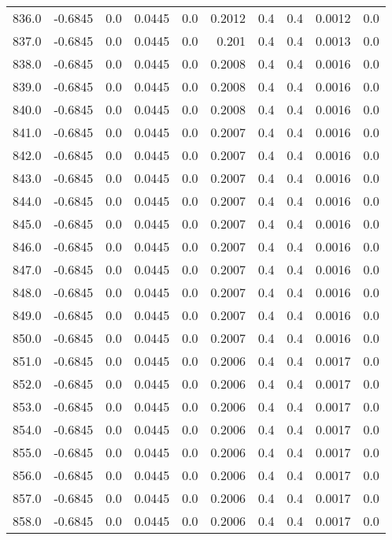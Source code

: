\begin{longtable}{lrrrrrrrrr}
836.0 & -0.6845 & 0.0 & 0.0445 & 0.0 & 0.2012 & 0.4 & 0.4 & 0.0012 & 0.0 \\
837.0 & -0.6845 & 0.0 & 0.0445 & 0.0 & 0.201 & 0.4 & 0.4 & 0.0013 & 0.0 \\
838.0 & -0.6845 & 0.0 & 0.0445 & 0.0 & 0.2008 & 0.4 & 0.4 & 0.0016 & 0.0 \\
839.0 & -0.6845 & 0.0 & 0.0445 & 0.0 & 0.2008 & 0.4 & 0.4 & 0.0016 & 0.0 \\
840.0 & -0.6845 & 0.0 & 0.0445 & 0.0 & 0.2008 & 0.4 & 0.4 & 0.0016 & 0.0 \\
841.0 & -0.6845 & 0.0 & 0.0445 & 0.0 & 0.2007 & 0.4 & 0.4 & 0.0016 & 0.0 \\
842.0 & -0.6845 & 0.0 & 0.0445 & 0.0 & 0.2007 & 0.4 & 0.4 & 0.0016 & 0.0 \\
843.0 & -0.6845 & 0.0 & 0.0445 & 0.0 & 0.2007 & 0.4 & 0.4 & 0.0016 & 0.0 \\
844.0 & -0.6845 & 0.0 & 0.0445 & 0.0 & 0.2007 & 0.4 & 0.4 & 0.0016 & 0.0 \\
845.0 & -0.6845 & 0.0 & 0.0445 & 0.0 & 0.2007 & 0.4 & 0.4 & 0.0016 & 0.0 \\
846.0 & -0.6845 & 0.0 & 0.0445 & 0.0 & 0.2007 & 0.4 & 0.4 & 0.0016 & 0.0 \\
847.0 & -0.6845 & 0.0 & 0.0445 & 0.0 & 0.2007 & 0.4 & 0.4 & 0.0016 & 0.0 \\
848.0 & -0.6845 & 0.0 & 0.0445 & 0.0 & 0.2007 & 0.4 & 0.4 & 0.0016 & 0.0 \\
849.0 & -0.6845 & 0.0 & 0.0445 & 0.0 & 0.2007 & 0.4 & 0.4 & 0.0016 & 0.0 \\
850.0 & -0.6845 & 0.0 & 0.0445 & 0.0 & 0.2007 & 0.4 & 0.4 & 0.0016 & 0.0 \\
851.0 & -0.6845 & 0.0 & 0.0445 & 0.0 & 0.2006 & 0.4 & 0.4 & 0.0017 & 0.0 \\
852.0 & -0.6845 & 0.0 & 0.0445 & 0.0 & 0.2006 & 0.4 & 0.4 & 0.0017 & 0.0 \\
853.0 & -0.6845 & 0.0 & 0.0445 & 0.0 & 0.2006 & 0.4 & 0.4 & 0.0017 & 0.0 \\
854.0 & -0.6845 & 0.0 & 0.0445 & 0.0 & 0.2006 & 0.4 & 0.4 & 0.0017 & 0.0 \\
855.0 & -0.6845 & 0.0 & 0.0445 & 0.0 & 0.2006 & 0.4 & 0.4 & 0.0017 & 0.0 \\
856.0 & -0.6845 & 0.0 & 0.0445 & 0.0 & 0.2006 & 0.4 & 0.4 & 0.0017 & 0.0 \\
857.0 & -0.6845 & 0.0 & 0.0445 & 0.0 & 0.2006 & 0.4 & 0.4 & 0.0017 & 0.0 \\
858.0 & -0.6845 & 0.0 & 0.0445 & 0.0 & 0.2006 & 0.4 & 0.4 & 0.0017 & 0.0 \\

\end{longtable}
